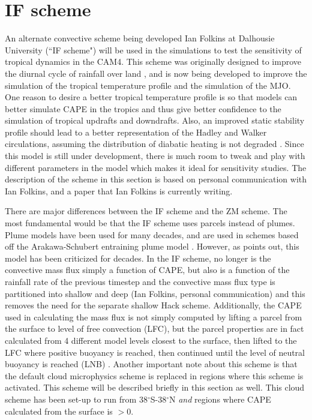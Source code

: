 \documentclass[letterpaper,12pt,titlepage,oneside,final]{book}
\begin{document}
\section{IF scheme}
An alternate convective scheme being developed Ian Folkins at Dalhousie University (``IF scheme") will be used in the simulations to test the sensitivity of tropical dynamics in the CAM4. This scheme was originally designed to improve the diurnal cycle of rainfall over land \citep{folkins_simple_2014}, and is now being developed to improve the simulation of the tropical temperature profile and the simulation of the MJO. One reason to desire a better tropical temperature profile is so that models can better simulate CAPE in the tropics and thus give better confidence to the simulation of tropical updrafts and downdrafts. Also, an improved static stability profile should lead to a better representation of the Hadley and Walker circulations, assuming the distribution of diabatic heating is not degraded \citep{sohn_role_2016,mitas_recent_2006}. Since this model is still under development, there is much room to tweak and play with different parameters in the model which makes it ideal for sensitivity studies. The description of the scheme in this section is based on personal communication with Ian Folkins, \cite{folkins_simple_2014} and a paper that Ian Folkins is currently writing.

There are major differences between the IF scheme and the ZM scheme. The most fundamental would be that the IF scheme uses parcels instead of plumes. Plume models have been used for many decades, and are used in schemes based off the Arakawa-Schubert entraining plume model \citep{yano_basic_2014}. However, as \cite{yano_basic_2014} points out, this model has been criticized for decades. In the IF scheme, no longer is the convective mass flux simply a function of CAPE, but also is a function of the rainfall rate of the previous timestep and the convective mass flux type is partitioned into shallow and deep (Ian Folkins, personal communication) and this removes the need for the separate shallow Hack scheme. Additionally, the CAPE used in calculating the mass flux is not simply computed by lifting a parcel from the surface to level of free convection (LFC), but the parcel properties are in fact calculated from 4 different model levels closest to the surface, then lifted to the LFC where positive buoyancy is reached, then continued until the level of neutral buoyancy is reached (LNB) \citep{folkins_simple_2014}. Another important note about this scheme is that the default cloud microphysics scheme is replaced in regions where this scheme is activated. This scheme will be described briefly in this section as well. This cloud scheme has been set-up to run from 38$^{\circ}$S-38$^{\circ}$N \textit{and} regions where CAPE calculated from the surface is $>0$.
\end{document}
